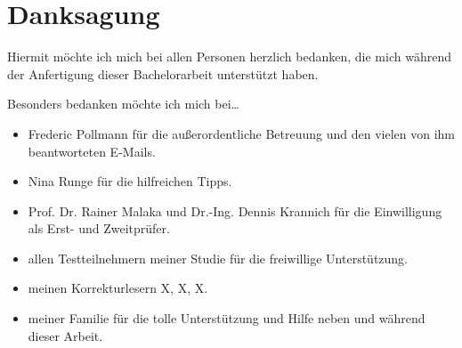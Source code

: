 \documentclass[a4paper,12pt,bibliography=totoc]{scrreprt}%
\begin{document}
\begin{appendix}

\end{appendix}

\chapter*{Danksagung}
Hiermit möchte ich mich bei allen Personen herzlich bedanken, die mich während der Anfertigung dieser Bachelorarbeit unterstützt haben.

Besonders bedanken möchte ich mich bei\dots
\begin{itemize}
\item Frederic Pollmann für die außerordentliche Betreuung und den vielen von ihm beantworteten E-Mails.
\item Nina Runge für die hilfreichen Tipps.
\item Prof. Dr. Rainer Malaka und Dr.-Ing. Dennis Krannich für die Einwilligung als Erst- und Zweitprüfer.
\item allen Testteilnehmern meiner Studie für die freiwillige Unterstützung.
\item meinen Korrekturlesern X, X, X.
\item meiner Familie für die tolle Unterstützung und Hilfe neben und während dieser Arbeit.
\end{itemize}
\end{document}
